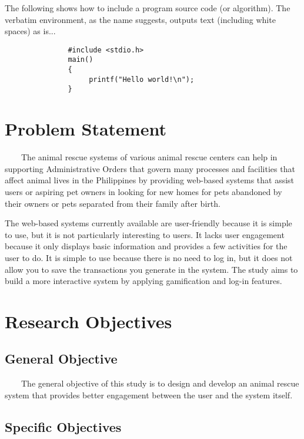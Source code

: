 The following shows how to include a program source code (or algorithm).  
The verbatim environment, as the name suggests, outputs text (including white spaces) as is...

\begin{verbatim}
               #include <stdio.h>
               main()
               {
                    printf("Hello world!\n");
               }
\end{verbatim}

\section{Problem Statement}

~~~~The animal rescue systems of various animal rescue centers can help in supporting Administrative Orders that govern many processes and facilities that affect animal lives in the Philippines by providing web-based systems that assist users or aspiring pet owners in looking for new homes for pets abandoned by their owners or pets separated from their family after birth.

The web-based systems currently available are user-friendly because it is simple to use, but it is not particularly interesting to users. It lacks user engagement because it only displays basic information and provides a few activities for the user to do. It is simple to use because there is no need to log in, but it does not allow you to save the transactions you generate in the system. The study aims to build a more interactive system by applying gamification and log-in features. 



\section{Research Objectives}
\label{sec:researchobjectives}

\subsection{General Objective}
\label{sec:generalobjective}

~~~~The general objective of this study is to design and develop an animal rescue system that provides better engagement between the user and the system itself.

\subsection{Specific Objectives}
\label{sec:specificobjectives}

